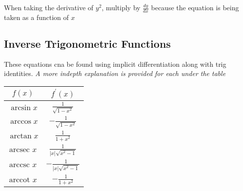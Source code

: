 \documentclass[12pt]{article}
\begin{document}
        When taking the derivative of $y^2$, multiply by $\frac{dy}{dx}$ because the equation is being taken
        as a function of $x$

        \subsection{Inverse Trigonometric Functions}

        These equations cna be found using implicit differentiation along with trig identities. 
        \textit{A more indepth explanation is provided for each under the table}

        \begin{center}
            \begin{tabular}{ | c | c |}
                \hline
                $f(x)$ & $f^{\prime}(x)$ \\
                \hline
                $\arcsin x$ & $\frac{1}{\sqrt{1 - x^2}}$ \\
                \hline
                $\arccos x$ & $-\frac{1}{\sqrt{1 - x^2}}$ \\
                \hline
                $\arctan x$ & $\frac{1}{1 + x^2}$ \\
                \hline
                $\text{arcsec } x$ & $\frac{1}{|x|\sqrt{x^2 - 1}}$ \\
                \hline
                $\text{arccsc } x$ & $-\frac{1}{|x|\sqrt{x^2 - 1}}$ \\
                \hline
                $\text{arccot } x$ & $-\frac{1}{1 + x^2}$ \\
                \hline
            \end{tabular}
        \end{center}
\end{document}
